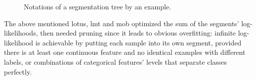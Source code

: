 \begin{figure}
\caption{Notations of a segmentation tree by an example.}
\label{fig_arbre_ex_notations}
\end{figure}

The above mentioned \gls{lotus}, \gls{lmt} and \gls{mob} optimized the sum of the segments' log-likelihoods, then needed pruning since it leads to obvious overfitting: infinite log-likelihood is achievable by putting each sample into its own segment, provided there is at least one continuous feature and no identical examples with different labels, or combinations of categorical features' levels that separate classes perfectly.

